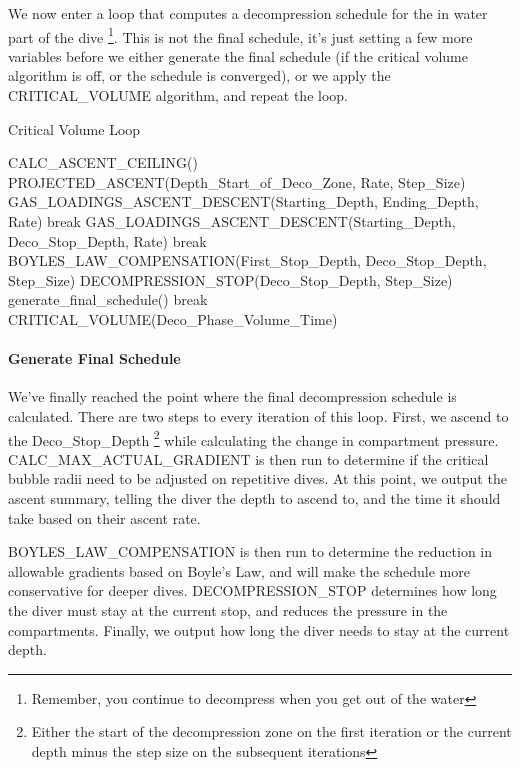 \documentclass[12pt]{article}
\begin{document}
We now enter a loop that computes a decompression schedule for the in water part of the dive \footnote{Remember, you
continue to decompress when you get out of the water}. This is not the final schedule, it's just setting a few more
variables before we either generate the final schedule (if the critical volume algorithm is off, or the
schedule is converged), or we apply the CRITICAL\_VOLUME algorithm, and repeat the loop.

\begin{algorithm}
\caption{Critical Volume Loop}
\label{pre4}
\begin{algorithmic}
\STATE CALC\_ASCENT\_CEILING()
\STATE PROJECTED\_ASCENT(Depth\_Start\_of\_Deco\_Zone, Rate, Step\_Size)
\STATE GAS\_LOADINGS\_ASCENT\_DESCENT(Starting\_Depth, Ending\_Depth, Rate)
\STATE break
\ENDIF
{}
\STATE GAS\_LOADINGS\_ASCENT\_DESCENT(Starting\_Depth, Deco\_Stop\_Depth, Rate)
\STATE    break
\ENDIF
\STATE BOYLES\_LAW\_COMPENSATION(First\_Stop\_Depth, Deco\_Stop\_Depth, Step\_Size)
\STATE DECOMPRESSION\_STOP(Deco\_Stop\_Depth, Step\_Size)
\ENDWHILE
{}
\STATE generate\_final\_schedule()
\STATE break
\ENDIF
\STATE CRITICAL\_VOLUME(Deco\_Phase\_Volume\_Time)
\ENDWHILE
\end{algorithmic}
\end{algorithm}

\paragraph{Generate Final Schedule}

We've finally reached the point where the final decompression schedule is calculated. There are two steps
to every iteration of this loop. First, we ascend to the Deco\_Stop\_Depth \footnote{Either the start of the
decompression zone on the first iteration or the current depth minus the step size on the subsequent iterations} while
calculating the change in compartment pressure. CALC\_MAX\_ACTUAL\_GRADIENT is then run
to determine if the critical bubble radii need to be adjusted on repetitive dives.
At this point, we output the ascent summary, telling the diver the depth to ascend to, and the time
it should take based on their ascent rate.

BOYLES\_LAW\_COMPENSATION is then run to determine the reduction in allowable
gradients based on Boyle's Law, and will make the schedule more conservative for deeper dives.
DECOMPRESSION\_STOP determines how long the diver must stay at the current stop, and reduces the
pressure in the compartments.
Finally, we output how long the diver needs to stay at the current depth.
\end{document}
